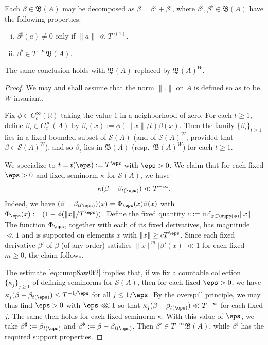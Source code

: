 \begin{lemma}\label{lem:standard:each-beta-in}
  Each $\beta \in \mathfrak{B}(A)$ may be decomposed as $\beta = \beta^\sharp + \beta^\flat$, where $\beta^\sharp, \beta^\flat \in \mathfrak{B}(A)$ have the following properties:
  \begin{enumerate}[(i)]
  \item $\beta^\sharp(a) \neq 0$ only if $\|a\| \ll T^{o(1)}$.
  \item $\beta^\flat \in T^{-\infty} \mathfrak{B}(A)$.
  \end{enumerate}
  The same conclusion holds with $\mathfrak{B}(A)$ replaced by $\mathfrak{B}(A)^W$.
\end{lemma}
\begin{proof}
  We may and shall assume that the norm $\|.\|$ on $A$ is defined so as to be $W$-invariant.

  Fix $\phi \in C_c^\infty(\mathbb{R})$ taking the value $1$ in a neighborhood of zero.  For each $t \geq 1$, define $\beta_t \in C_c^\infty(A)$ by $\beta_t(x) := \phi(\|x\|/t) \beta(x)$.  Then the family $\{\beta_t\}_{t \geq 1}$ lies in a fixed bounded subset of $\mathcal{S}(A)$ (and of $\mathcal{S}(A)^W$, provided that $\beta \in \mathcal{S}(A)^W$), and so $\beta_t$ lies in $\mathfrak{B}(A)$ (resp.\ $\mathfrak{B}(A)^W$) for each $t \geq 1$.

  We specialize to $t = t(\eps) := T^{\eps}$ with $\eps > 0$.  We claim that for each fixed $\eps > 0$ and fixed seminorm $\kappa$ for $\mathcal{S}(A)$, we have
  \begin{equation}\label{eq:cump8aw0t2}
    \kappa(\beta - \beta_{t(\eps)}) \ll T^{- \infty}.
  \end{equation}
  Indeed, we have $(\beta - \beta_{t(\eps)})(x) = \Phi_\eps(x) \beta(x)$ with $\Phi_\eps(x) := (1 - \phi(\|x\| / T^\eps))$.  Define the fixed quantity $c := \inf_{x \in \supp(\phi)} \lVert x \rVert$.  The function $\Phi_\eps$, together with each of its fixed derivatives, has magnitude $\ll 1$ and is supported on elements $x$ with $\|x\| \geq c T^{\eps}$.  Since each fixed derivative $\beta '$ of $\beta$ (of any order) satisfies $\|x\|^m |\beta '(x)| \ll 1$ for each fixed $m \geq 0$, the claim follows.

  The estimate \eqref{eq:cump8aw0t2} implies that, if we fix a countable collection $\{\kappa_j\}_{j \geq 1}$ of defining seminorms for $\mathcal{S}(A)$, then for each fixed $\eps > 0$, we have $\kappa_j(\beta - \beta_{t(\eps)}) \leq T^{-1/\eps}$ for all $j \leq 1/\eps$.  By the overspill principle, we may thus find $\eps > 0$ with $\eps \lll 1$ so that $\kappa_j(\beta - \beta_{t(\eps)}) \ll T^{-\infty}$ for each fixed $j$.  The same then holds for each fixed seminorm $\kappa$.  With this value of $\eps$, we take $\beta^\sharp := \beta_{t(\eps)}$ and $\beta^\flat := \beta - \beta_{t(\eps)}$.  Then $\beta^\flat \in T^{-\infty} \mathfrak{B}(A)$, while $\beta^\sharp$ has the required support properties.
\end{proof}

